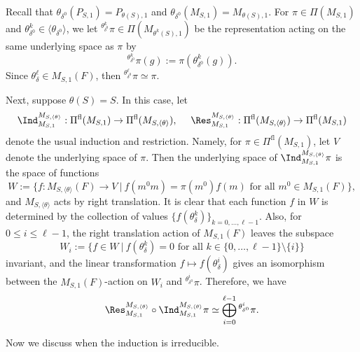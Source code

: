 \documentclass[11pt,letterpaper]{amsart}
\numberwithin{equation}{section}
\begin{document}
Recall that $\theta_{\delta^0}(P_{S,1})= P_{\theta(S),1}$ and $\theta_{\delta^0}(M_{S,1})= M_{\theta(S),1}$. For $\pi \in \Pi(M_{S,1})$ and $\theta_{\delta^0}^k \in \langle \theta_{\delta^0} \rangle$, we
let ${}^{\theta_{\delta^0}^k}\pi \in \Pi(M_{\theta^k(S),1})$ be the representation acting on the same underlying space as $\pi$ by
\[ {}^{\theta_{\delta^0}^k}\pi(g):= \pi( \theta_{\delta^0}^k(g)).\]
Since $\theta_{\delta}^{\ell} \in M_{S,1}(F)$, then ${}^{\theta_{\delta^0}^{\ell}}\pi \simeq \pi$. 

Next, suppose $\theta(S)=S$. 
In this case, let 
\[ \Ind_{M_{S,1}}^{M_{S,\langle \theta\rangle}}: \Pi^{\textrm{fl}}(M_{S,1}) \to \Pi^{\textrm{fl}}(M_{S,\langle \theta \rangle}),\ \ \ \ \Res_{M_{S,1}}^{M_{S,\langle \theta\rangle}}: \Pi^{\textrm{fl}}(M_{S,\langle \theta \rangle}) \to \Pi^{\textrm{fl}}(M_{S,1})\]
denote the usual induction and restriction. Namely, for $\pi \in \Pi^{\textrm{fl}}(M_{S,1}) $, let $V$ denote the underlying space of $\pi$. Then the underlying space of $\Ind_{M_{S,1}}^{M_{S,\langle \theta\rangle}}\pi$ is the space of functions
\[ W:=\{f:M_{S,\langle \theta\rangle}(F) \to V\ | \ f(m^0 m)= \pi(m^0) f(m) \text{ for all }m^0 \in M_{S,1}(F) \},\]
and $M_{S,\langle \theta \rangle}$ acts by right translation. It is clear that each function $f$ in $W$ is determined by the collection of values $\{f( \theta_{\delta}^k )\}_{k=0,\ldots, \ell-1}$. Also, 
for $0 \leq i\leq \ell-1$, the right translation action of $M_{S,1}(F)$ leaves the subspace 
\[ W_i:=\{f \in W\ | \ f(\theta_{\delta}^k)=0 \text{ for all }k \in \{0,\ldots,\ell-1\}\setminus \{i\}  \} \]
invariant, and the linear transformation $f \mapsto f(\theta_{\delta}^i)$ gives an isomorphism between the  $M_{S,1}(F)$-action on $W_i$ and ${}^{\theta_{\delta^0}^i}\pi$. Therefore, we have
\begin{align}\label{eq finite index restriction}
   \Res_{M_{S,1}}^{M_{S,\langle \theta \rangle}} \circ \Ind_{M_{S,1}}^{M_{S,\langle \theta \rangle}}\pi \simeq \bigoplus_{i=0}^{\ell-1} {}^{\theta_{\delta^0}^{i}}\pi.
\end{align}

Now we discuss when the induction is irreducible.
\end{document}
